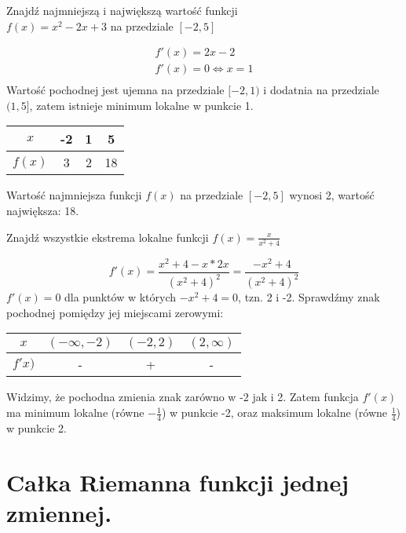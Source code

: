 \documentclass[main.tex]{subfiles}
\begin{document}
    \begin{exercise}
        Znajdź najmniejszą i największą wartość funkcji\\ $f(x) = x^2 - 2x + 3$ na przedziale $[-2, 5]$
    \end{exercise}

    \begin{gather*}
        f'(x) = 2x - 2\\
        f'(x) = 0 \Leftrightarrow x = 1\\
    \end{gather*}
    Wartość pochodnej jest ujemna na przedziale $[-2, 1)$ i dodatnia na przedziale $(1, 5]$, zatem istnieje minimum lokalne w punkcie 1.

    \begin{center}
        \begin{tabular}{c||c|c|c}
            $x$ & -2 & 1 & 5 \\
            \hline
            $f(x)$ & 3 & 2 & 18 \\
        \end{tabular}
    \end{center}

    Wartość najmniejsza funkcji $f(x)$ na przedziale $[-2, 5]$ wynosi 2, wartość największa: 18.


    \begin{exercise}
        Znajdź wszystkie ekstrema lokalne funkcji $f(x) = \frac{x}{x^2 + 4}$
    \end{exercise}

    \[f'(x) = \frac{x^2 + 4 - x * 2x}{(x^2 + 4)^2} = \frac{-x^2 + 4}{(x^2 + 4)^2}\]
    $f'(x) = 0$ dla punktów w których $-x^2 + 4 = 0$, tzn. 2 i -2. Sprawdźmy znak pochodnej pomiędzy jej miejscami zerowymi:

    \begin{center}
        \begin{tabular}{c||c|c|c}
            $x$ &$(-\infty, -2)$ & $(-2, 2)$ & $(2, \infty)$ \\
            \hline
            $f'x)$ & - & + & -
        \end{tabular}
    \end{center}

    Widzimy, że pochodna zmienia znak zarówno w -2 jak i 2. Zatem funkcja $f'(x)$ ma minimum lokalne
    (równe $-\frac{1}{4}$) w punkcie -2, oraz maksimum lokalne (równe $\frac{1}{4}$) w punkcie 2.

    \newpage

    \section{Całka Riemanna funkcji jednej zmiennej.}
\end{document}

